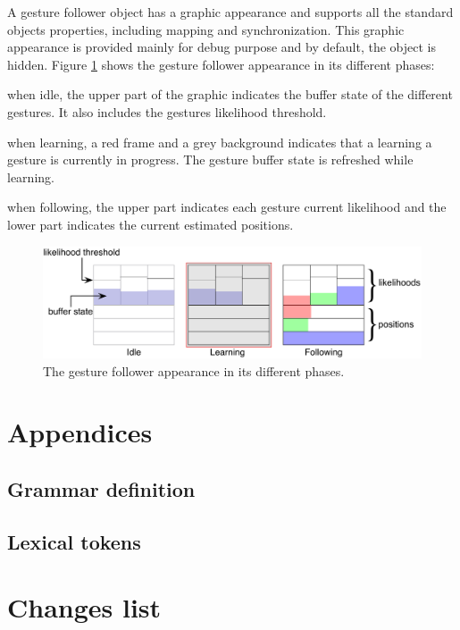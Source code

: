 \documentclass[a4paper,twoside]{report}
\newcommand{\toplevel}[1]	{\chapter{#1}}
\newcommand{\sublevel}[1]	{\section{#1}}
\let\olditemize\itemize
\let\oldenditemize\enditemize
\renewenvironment{itemize} 	{\olditemize \setlength{\itemsep}{1mm}}{\oldenditemize}
\begin{document}
A gesture follower object has a graphic appearance and supports all the standard objects properties, including mapping and synchronization. This graphic appearance is provided mainly for debug purpose and by default, the object is hidden. Figure  \ref{fig:gfgraph} shows the gesture follower appearance in its different phases:
\begin{itemize}
\item when idle, the upper part of the graphic indicates the buffer state of the different gestures. It also includes the gestures likelihood threshold.
\item when learning, a red frame and a grey background indicates that a learning a gesture is currently in progress. The gesture buffer state is refreshed while learning.
\item when following, the upper part indicates each gesture current likelihood and the lower part indicates the current estimated positions.
\end{itemize}


\begin{figure}[h]
	\centering \includegraphics[width=0.95\columnwidth]{imgs/gesture-follower}
 \caption{The gesture follower appearance in its different phases.}
 \label{fig:gfgraph}
\end{figure}




\toplevel{Appendices}
\sublevel{Grammar definition}
\label{yacc}


\sublevel{Lexical tokens}
\label{lex}



\toplevel{ Changes list}
\label{changes}



\printindex
\end{document}
